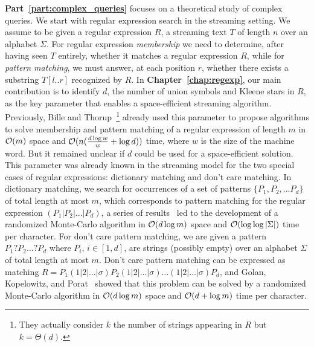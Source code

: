 \textbf{Part~\ref{part:complex_queries}} focuses on a theoretical study of complex queries. 
%
We start with regular expression search in the streaming setting.
%
We assume to be given a regular expression $R$, a streaming text $T$ of length $n$ over an alphabet $\Sigma$. For regular expression \emph{membership} we need to determine, after having seen $T$ entirely, whether it matches a regular expression $R$, while for \emph{pattern matching}, we must answer, at each position $r$, whether there exists a substring $T[l..r]$ recognized by $R$.
In \textbf{Chapter~\ref{chap:regexp}}, our main contribution is to identify $d$, the number of union symbols and Kleene stars in $R$, as the key parameter that enables a space-efficient streaming algorithm. 
Previously, Bille and Thorup~\cite{doi:10.1137/1.9781611973075.104}\footnote{They actually consider $k$ the number of strings appearing in $R$ but $k=\Theta(d)$.} already used this parameter to propose algorithms to solve membership and pattern matching of a regular expression of length $m$ in $\mathcal{O}(m)$ space and $\mathcal{O}(n(\frac{d\log w}{w} + \log d))$ time, where $w$ is the size of the machine word. But it remained unclear if $d$ could be used for a space-efficient solution.
This parameter was already known in the streaming model for the two special cases of regular expressions: dictionary matching and don't care matching. In dictionary matching, we search for occurrences of a set of patterns $\{P_1, P_2, ... P_d \}$ of total length at most $m$, which corresponds to pattern matching for the regular expression $(P_1| P_2| ... | P_d)$, a series of results~\cite{Porat:09,pattern_match_BG14,DBLP:conf/esa/CliffordFPSS15,DBLP:conf/esa/GolanP17,DBLP:conf/icalp/GolanKP18} led to the development of a randomized Monte-Carlo algorithm in $\mathcal{O}(d\log m)$ space and $\mathcal{O}(\log \log |\Sigma|)$ time per character.
For don't care pattern matching, we are given a pattern $P_1 ? P_2 ... ? P_d$ where $P_i$, $i \in [1,d]$, are strings (possibly empty) over an alphabet $\Sigma$ of total length at most $m$. Don't care pattern matching can be expressed as matching $R = P_1 (1|2|\ldots|\sigma) P_2 (1|2|\ldots|\sigma) \ldots (1|2|\ldots|\sigma) P_{d}$, and Golan, Kopelowitz, and Porat~\cite{DBLP:journals/algorithmica/GolanKP19} showed that this problem can be solved by a randomized Monte-Carlo algorithm in $\mathcal{O}(d \log m)$ space and $\mathcal{O}(d+\log m)$ time per character.

